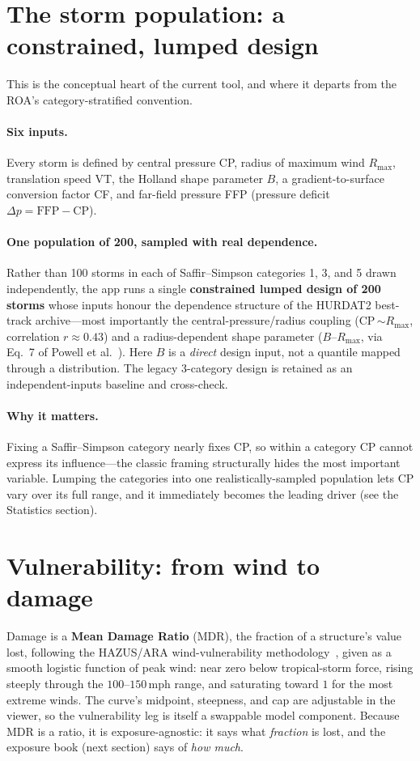 \documentclass[11pt]{article}
\begin{document}
\section{The storm population: a constrained, lumped design}
This is the conceptual heart of the current tool, and where it departs from the ROA's
category-stratified convention.

\paragraph{Six inputs.} Every storm is defined by central pressure CP, radius of maximum
wind $R_{\max}$, translation speed VT, the Holland shape parameter $B$, a
gradient-to-surface conversion factor CF, and far-field pressure FFP (pressure deficit
$\Delta p=\text{FFP}-\text{CP}$).

\paragraph{One population of 200, sampled with real dependence.} Rather than 100 storms
in each of Saffir--Simpson categories 1, 3, and 5 drawn independently, the app runs a
single \textbf{constrained lumped design of 200 storms} whose inputs honour the
dependence structure of the HURDAT2 best-track archive---most importantly the
central-pressure/radius coupling (CP\,$\sim R_{\max}$, correlation $r\approx0.43$) and a
radius-dependent shape parameter ($B$--$R_{\max}$, via Eq.~7 of Powell et
al.~\cite{powell}). Here $B$ is a \emph{direct} design input, not a quantile mapped
through a distribution. The legacy
3-category design is retained as an independent-inputs baseline and cross-check.

\paragraph{Why it matters.} Fixing a Saffir--Simpson category nearly fixes CP, so within
a category CP cannot express its influence---the classic framing structurally hides the
most important variable. Lumping the categories into one realistically-sampled population
lets CP vary over its full range, and it immediately becomes the leading driver
(see the Statistics section).

\section{Vulnerability: from wind to damage}
Damage is a \textbf{Mean Damage Ratio} (MDR), the fraction of a structure's value lost,
following the HAZUS/ARA wind-vulnerability methodology~\cite{hazus,vickery2006,araoir2024},
given as a smooth logistic function of peak wind: near zero below tropical-storm force,
rising steeply through the $100$--$150$\,mph range, and saturating toward $1$ for the
most extreme winds. The curve's midpoint, steepness, and cap are adjustable in the
viewer, so the vulnerability leg is itself a swappable model component. Because MDR is a
ratio, it is exposure-agnostic: it says what \emph{fraction} is lost, and the exposure
book (next section) says of \emph{how much}.
\end{document}
